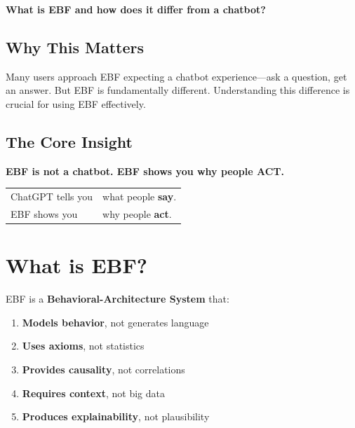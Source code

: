 \begin{tcolorbox}[colback=red!5!white, colframe=red!75!black,
    title=The Fundamental Question]
\textbf{What is EBF and how does it differ from a chatbot?}
\end{tcolorbox}

\subsection{Why This Matters}

Many users approach EBF expecting a chatbot experience---ask a question,
get an answer. But EBF is fundamentally different. Understanding this
difference is crucial for using EBF effectively.

\subsection{The Core Insight}

\begin{tcolorbox}[colback=green!5!white, colframe=green!75!black]
\textbf{EBF is not a chatbot. EBF shows you why people ACT.}

\begin{center}
\begin{tabular}{ll}
ChatGPT tells you & what people \textbf{say}. \\
EBF shows you & why people \textbf{act}. \\
\end{tabular}
\end{center}
\end{tcolorbox}


\section{What is EBF?}
\label{sec:ref-ebf-what}

EBF is a \textbf{Behavioral-Architecture System} that:

\begin{enumerate}
\item \textbf{Models behavior}, not generates language
\item \textbf{Uses axioms}, not statistics
\item \textbf{Provides causality}, not correlations
\item \textbf{Requires context}, not big data
\item \textbf{Produces explainability}, not plausibility
\end{enumerate}

